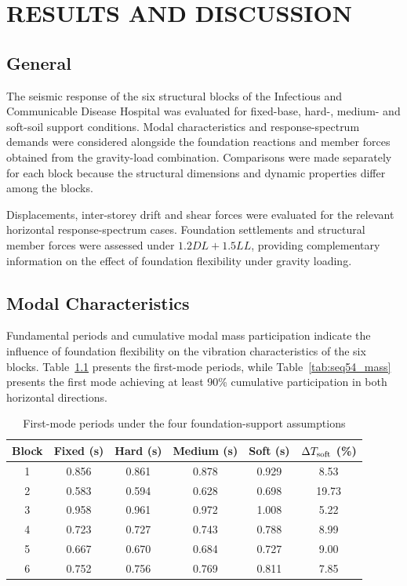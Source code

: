 \chapter{RESULTS AND DISCUSSION}

\section{General}

The seismic response of the six structural blocks of the Infectious and Communicable Disease Hospital was evaluated for fixed-base, hard-, medium- and soft-soil support conditions. Modal characteristics and response-spectrum demands were considered alongside the foundation reactions and member forces obtained from the gravity-load combination. Comparisons were made separately for each block because the structural dimensions and dynamic properties differ among the blocks.

Displacements, inter-storey drift and shear forces were evaluated for the relevant horizontal response-spectrum cases. Foundation settlements and structural member forces were assessed under $1.2DL+1.5LL$, providing complementary information on the effect of foundation flexibility under gravity loading.



\section{Modal Characteristics}

Fundamental periods and cumulative modal mass participation indicate the influence of foundation flexibility on the vibration characteristics of the six blocks. Table~\ref{tab:seq54_modal} presents the first-mode periods, while Table~\ref{tab:seq54_mass} presents the first mode achieving at least 90\% cumulative participation in both horizontal directions.

\begin{table}[!htbp]
\fontsize{11}{13}\selectfont\setlength{\tabcolsep}{4pt}
\centering
\fontsize{11}{13}\selectfont\setlength{\tabcolsep}{4pt}\renewcommand{\arraystretch}{0.95}
\caption{First-mode periods under the four foundation-support assumptions}\label{tab:seq54_modal}
\begin{tabular*}{\linewidth}{@{\extracolsep{\fill}}cccccc@{}}
\toprule
Block & Fixed (s) & Hard (s) & Medium (s) & Soft (s) & $\Delta T_{\rm soft}$ (\%)\\
\midrule
1 & 0.856 & 0.861 & 0.878 & 0.929 & 8.53 \\
2 & 0.583 & 0.594 & 0.628 & 0.698 & 19.73 \\
3 & 0.958 & 0.961 & 0.972 & 1.008 & 5.22 \\
4 & 0.723 & 0.727 & 0.743 & 0.788 & 8.99 \\
5 & 0.667 & 0.670 & 0.684 & 0.727 & 9.00 \\
6 & 0.752 & 0.756 & 0.769 & 0.811 & 7.85 \\
\bottomrule
\end{tabular*}
\end{table}

